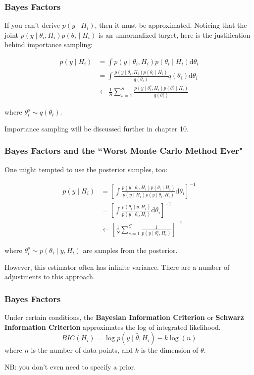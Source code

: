 \documentclass{beamer}
\begin{document}
\begin{frame}
\frametitle{Bayes Factors}

If you can't derive $p(y \mid H_i)$, then it must be approximated. Noticing that the joint $p(y \mid \theta_i, H_i)p(\theta_i \mid H_i)$ is an unnormalized target, here is the justification behind importance sampling:

\begin{align*}
p(y \mid H_i) &= \int p(y \mid \theta_i, H_i)p(\theta_i \mid H_i) \text{d}\theta_i \\
&= \int \frac{p(y \mid \theta_i, H_i)p(\theta_i \mid H_i)}{q(\theta_i)}q(\theta_i) \text{d}\theta_i \\
&\leftarrow \frac{1}{S}\sum_{s=1}^S \frac{p(y \mid \theta^s_i, H_i)p(\theta^s_i \mid H_i)}{q(\theta^s_i)}
\end{align*}

where $\theta^s_i \sim q(\theta_i)$.
\newline

Importance sampling will be discussed further in chapter 10.
\end{frame}

\begin{frame}
\frametitle{Bayes Factors and the ``Worst Monte Carlo Method Ever" }

One might tempted to use the posterior samples, too:

\begin{align*}
p(y \mid H_i)
&= \left[  \int \frac{p(y \mid \theta_i,  H_i)p(\theta_i \mid H_i)}{p(y \mid H_i) p(y \mid \theta_i, H_i) } \text{d}\theta_i \right]^{-1}\\
&= \left[  \int \frac{p(\theta_i\mid y,  H_i) }{p(y \mid \theta_i, H_i) } \text{d}\theta_i \right]^{-1} \tag{Bayes' theorem}\\
& \leftarrow  \left[  \frac{1}{S}\sum_{s=1}^S\frac{1 }{p(y \mid \theta_i^s, H_i) } \right]^{-1}
\end{align*}

where $\theta^s_i \sim p(\theta_i\mid y,  H_i)$ are samples from the posterior. 
\newline

However, this estimator often has infinite variance. There are a number of adjustments to this approach. 
\end{frame}

\begin{frame}
\frametitle{Bayes Factors}

Under certain conditions, the {\bf Bayesian Information Criterion} or {\bf Schwarz Information Criterion} approximates the log of integrated likelihood. 
\[
BIC(H_i) = \log p(y \mid \hat{\theta}, H_i) - k \log(n)
\]
where $n$ is the number of data points, and $k$ is the dimension of $\theta$.
\newline

NB: you don't even need to specify a prior.

\end{frame}
\end{document}
